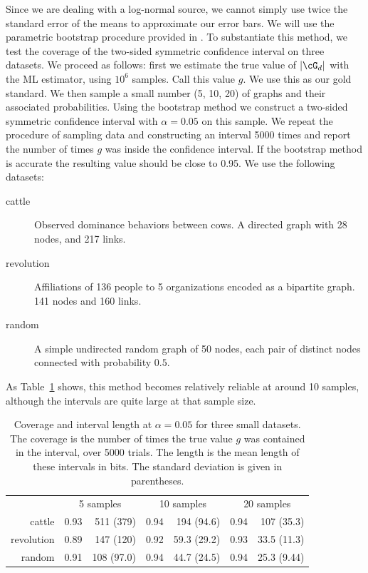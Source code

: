 Since we are dealing with a log-normal source, we cannot simply use twice the standard error of the means to approximate our error bars. We will use the parametric bootstrap procedure provided in \cite{angus1994bootstrap,zhou1997confidence}. To substantiate this method, we test the coverage of the two-sided symmetric confidence interval on three datasets. We proceed as follows: first we estimate the true value of $|\cG_d|$ with the ML estimator, using $10^6$ samples. Call this value $g$. We use this as our gold standard. We then sample a small number (5, 10, 20) of graphs and their associated probabilities. Using the bootstrap method we construct a two-sided symmetric confidence interval with $\alpha = 0.05$ on this sample. We repeat the procedure of sampling data and constructing an interval 5000 times and report the number of times $g$ was inside the confidence interval. If the bootstrap method is accurate the resulting value should be close to 0.95. We use the following datasets:
  \begin{description}
  \item[cattle] Observed dominance behaviors between cows. A directed graph with 28 nodes, and 217 links. \cite{schein1955social,konect:2015:moreno_cattle}
  \item[revolution] Affiliations of 136 people to 5 organizations encoded as a bipartite graph. 141 nodes and 160 links. \cite{konect:2015:brunson_revolution}
  \item[random] A simple undirected random graph of 50 nodes, each pair of distinct nodes connected with probability $0.5$.
  \end{description}
As Table~\ref{table:coverage-experiment} shows, this method becomes relatively reliable at around 10 samples, although the intervals are quite large at that sample size.

\begin{table}
  {\centering
  \begin{tabular}{|r|r r|r r|r r|}
  \hline
   &  \multicolumn{2}{c|}{5 samples} & \multicolumn{2}{c|}{10 samples}  & \multicolumn{2}{c|}{20 samples}  \\
  cattle  & 0.93 & 511 (379) & 0.94 & 194 (94.6) & 0.94 & 107 (35.3) \\
  revolution   & 0.89 & 147 (120) & 0.92 & 59.3 (29.2) & 0.93 & 33.5 (11.3) \\
  random  & 0.91 & 108 (97.0) & 0.94 & 44.7 (24.5) & 0.94 & 25.3 (9.44) \\
  \hline
  \end{tabular}
  }

  \caption{Coverage and interval length at $\alpha=0.05$ for three small datasets. The coverage is the number of times the true value $g$ was contained in the interval, over 5000 trials. The length is the mean length of these intervals in bits. The standard deviation is given in parentheses. } 
  \label{table:coverage-experiment}
\end{table}